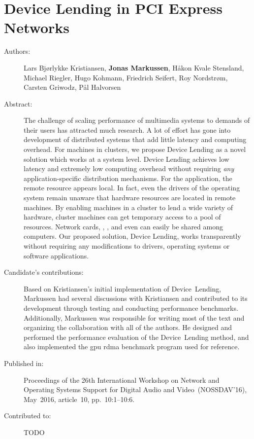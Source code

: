 \chapter{Device Lending in PCI Express Networks}
\label{paper:NOSSDAV}
\paperthumb

\begin{description}
	\item[Authors:]
		Lars Bj{\o}rlykke Kristiansen, \textbf{Jonas Markussen}, H{\aa}kon Kvale Stensland,
		Michael Riegler, Hugo Kohmann, Friedrich Seifert, Roy Nordstr{\o}m, Carsten Griwodz, P{\aa}l Halvorsen

	\item[Abstract:]
		The challenge of scaling  performance of multimedia systems to demands
		of their users has attracted much research.
		A lot of effort has gone into
		development of distributed systems that add little latency and computing overhead.
		For machines in  clusters,
		we propose Device Lending as a novel solution which works at a system
		level.
		Device Lending achieves low latency and extremely low computing overhead without
		requiring \textit{any} application-specific distribution mechanisms.
		For the application, the remote  resource appears local.
		In fact, even the drivers of the operating system remain unaware that
		hardware resources are located in remote machines.
		By enabling machines in a  cluster to lend a wide variety of hardware, 
		cluster machines can get temporary access to a pool of  resources. 
		Network cards, , , and even  can easily 
		be shared among computers.
		Our proposed solution, Device Lending, works transparently without requiring any modifications to drivers,
		operating systems or software applications.

	\item[Candidate's contributions:]
	    Based on Kristiansen's initial implementation of Device~Lending, Markussen had several discussions with Kristiansen and contributed to its development through testing and conducting performance benchmarks.
		Additionally, Markussen was responsible for writing most of the text and organizing the collaboration with all of the authors.
		He designed and performed the performance evaluation of the Device~Lending method, and also implemented the \acrshort{gpu} \acrshort{rdma} benchmark program used for reference.
		

	\item[Published in:]
		Proceedings of the 26th International Workshop on Network and Operating Systems Support for Digital Audio and Video~(NOSSDAV'16),
		May~2016, article~10, pp.~10:1--10:6.

	\item[Contributed to:]
		TODO

\end{description}
